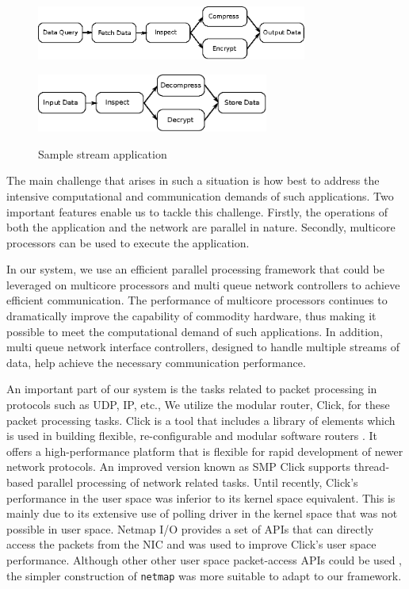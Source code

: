 \documentclass[conference]{IEEEtran}
\begin{document}
\begin{figure}[ht]
\centering
\subfigure
{
	\includegraphics[width=3.5in]{ip-data-proc}
}

\subfigure
{
	\includegraphics[width=3in]{op-data-proc}
}
\caption{Sample stream application}
\label{fig1}
\end{figure}

The main challenge that arises in such a situation is how best to address the intensive computational and communication demands of such applications. Two important features enable us to tackle this challenge. Firstly, the operations of both the application and the network are parallel in nature. Secondly, multicore processors can be used to execute the application.

In our system, we use an efficient parallel processing framework that could be leveraged on multicore processors and multi queue network controllers to achieve efficient communication. The performance of multicore processors continues to dramatically improve the capability of commodity hardware, thus making it possible to meet the computational demand of such applications. In addition, multi queue network interface controllers, designed to handle multiple streams of data, help achieve the necessary communication performance.

An important part of our system is the tasks related to packet processing in protocols such as UDP, IP, etc., We utilize the modular router, Click, for these packet processing tasks. Click is a tool that includes a library of elements which is used in building flexible, re-configurable and modular software routers \cite{Kohler2000}. It offers a high-performance platform that is flexible for rapid development of newer network protocols. An improved version known as SMP Click supports thread-based parallel processing of network related tasks\cite{Chen:2001:FCP:647055.759948}. Until recently, Click's performance in the user space was inferior to its kernel space equivalent. This is mainly due to its extensive use of polling driver in the kernel space that was not possible in user space. Netmap I/O\cite{Rizzo:2012:RNI:2090147.2103536} provides a set of APIs that can directly access the packets from the NIC and was used to improve Click's user space performance. Although other other user space packet-access APIs could be used \cite{Rizzo:2012:RNI:2090147.2103536} \cite{1564468} \cite{Krasnyansky}, the simpler construction of \texttt{netmap} was more suitable to adapt to our framework.
\end{document}
